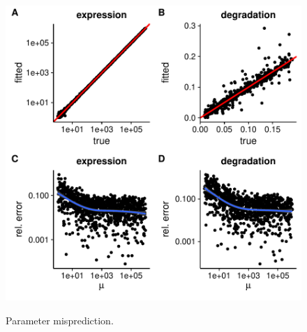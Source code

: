 \begin{figure}
 \includegraphics[width=\linewidth]{fig/parameters}\\
 \caption{Parameter misprediction.}
\end{figure}